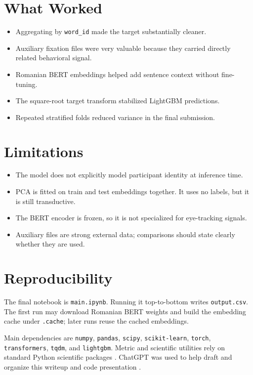\documentclass[10pt]{article}
\begin{document}
\section{What Worked}

\begin{itemize}
  \item Aggregating by \texttt{word\_id} made the target substantially cleaner.
  \item Auxiliary fixation files were very valuable because they carried directly related behavioral signal.
  \item Romanian BERT embeddings helped add sentence context without fine-tuning.
  \item The square-root target transform stabilized LightGBM predictions.
  \item Repeated stratified folds reduced variance in the final submission.
\end{itemize}

\section{Limitations}

\begin{itemize}
  \item The model does not explicitly model participant identity at inference time.
  \item PCA is fitted on train and test embeddings together. It uses no labels, but it is still transductive.
  \item The BERT encoder is frozen, so it is not specialized for eye-tracking signals.
  \item Auxiliary files are strong external data; comparisons should state clearly whether they are used.
\end{itemize}

\section{Reproducibility}

The final notebook is \texttt{main.ipynb}. Running it top-to-bottom writes \texttt{output.csv}. The first run may download Romanian BERT weights and build the embedding cache under \texttt{.cache}; later runs reuse the cached embeddings.

Main dependencies are \texttt{numpy}, \texttt{pandas}, \texttt{scipy}, \texttt{scikit-learn}, \texttt{torch}, \texttt{transformers}, \texttt{tqdm}, and \texttt{lightgbm}. Metric and scientific utilities rely on standard Python scientific packages \citep{pedregosa2011scikit,virtanen2020scipy}. ChatGPT was used to help draft and organize this writeup and code presentation \citep{chatgpt2026}.

\clearpage


\end{document}
